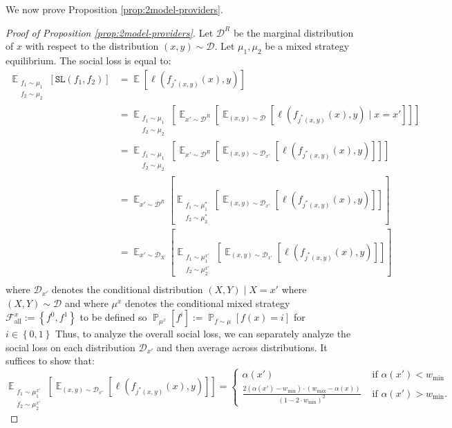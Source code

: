 \documentclass[letterpaper,11pt]{article}
\theoremstyle{plain}
\DeclareMathOperator*{\E}{\mathbb{E}}
\DeclareMathOperator*{\Prob}{\mathbb{P}}
\begin{document}
We now prove Proposition \ref{prop:2model-providers}.
\begin{proof}[Proof of Proposition \ref{prop:2model-providers}]
Let $\mathcal{D}^R$ be the marginal distribution of $x$ with respect to the distribution $(x,y) \sim \mathcal{D}$. 
Let $\mu_1, \mu_2$ be a mixed strategy equilibrium. The social loss is equal to:
\begin{align*}
 \E_{\substack{f_1 \sim \mu_1 \\ f_2 \sim \mu_2}}[\texttt{SL}(f_1, f_2)] &= \E[\ell(f_{j^*(x,y)}(x), y)] \\
 &= \E_{\substack{f_1 \sim \mu_1 \\ f_2 \sim \mu_2}}\left[\E_{x' \sim \mathcal{D}^R} \left[\E_{(x,y) \sim \mathcal{D}}[\ell(f_{j^*(x,y)}(x), y) \mid x = x']\right]\right] \\
 &= \E_{\substack{f_1 \sim \mu_1 \\ f_2 \sim \mu_2}}\left[\E_{x' \sim \mathcal{D}^R} \left[ \E_{(x,y) \sim \mathcal{D}_{x'}}[\ell(f_{j^*(x,y)}(x), y)]\right]\right] \\
 &= \E_{x' \sim \mathcal{D}^R} \left[ \E_{\substack{f_1 \sim \mu^*_1 \\ f_2 \sim \mu^*_2}} \left[\E_{(x,y) \sim \mathcal{D}_{x'}}[\ell(f_{j^*(x,y)}(x), y)]\right]\right] \\
 &= \E_{x' \sim \mathcal{D}_X} \left[ \E_{\substack{f_1 \sim \mu^{x'}_1 \\ f_2 \sim \mu^{x'}_2}}\left[\E_{(x,y) \sim  \mathcal{D}_{x'}}[\ell(f_{j^*(x,y)}(x), y)]\right]\right] \\
\end{align*}
where $\mathcal{D}_{x'}$ denotes the conditional distribution $(X,Y) \mid X = x'$ where $(X,Y) \sim \mathcal{D}$ and where $\mu^x$ denotes the conditional mixed strategy $\mathcal{F}_{\text{all}}^x := \left\{f^0, f^1\right\}$ to be defined so $\Prob_{\mu^x}[f^i] := \Prob_{f \sim \mu}[f(x) = i]$ for $i \in \left\{0,1\right\}$
Thus, to analyze the overall social loss, we can separately analyze the social loss on each distribution $\mathcal{D}_{x'}$ and then average across distributions. It suffices to show that:
\[ \E_{\substack{f_1 \sim \mu^{x'}_1 \\ f_2 \sim \mu^{x'}_2}}\left[\E_{(x,y) \sim \mathcal{D}_{x'}}[\ell(f_{j^*(x,y)}(x), y)]\right] = 
\begin{cases}
 \alpha(x') & \text{ if } \alpha(x') < w_{\text{min}} \\
 \frac{2(\alpha(x') - w_{\text{min}}) \cdot (w_{\text{max}} - \alpha(x))}{(1 - 2 \cdot w_{\text{min}})^2} & \text{ if }\alpha(x') > w_{\text{min}}.
\end{cases}
\]


\end{proof}
\end{document}
